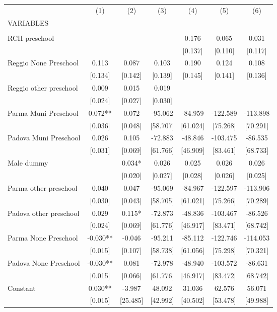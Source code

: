 \begin{tabular}{lcccccc} \hline
 & (1) & (2) & (3) & (4) & (5) & (6) \\
VARIABLES &  &  &  &  &  &  \\ \hline
 &  &  &  &  &  &  \\
RCH preschool &  &  &  & 0.176 & 0.065 & 0.031 \\
 &  &  &  & [0.137] & [0.110] & [0.117] \\
Reggio None Preschool & 0.113 & 0.087 & 0.103 & 0.190 & 0.124 & 0.108 \\
 & [0.134] & [0.142] & [0.139] & [0.145] & [0.141] & [0.136] \\
Reggio other preschool & 0.009 & 0.015 & 0.019 &  &  &  \\
 & [0.024] & [0.027] & [0.030] &  &  &  \\
Parma Muni Preschool & 0.072** & 0.072 & -95.062 & -84.959 & -122.589 & -113.898 \\
 & [0.036] & [0.048] & [58.707] & [61.024] & [75.268] & [70.291] \\
Padova Muni Preschool & 0.026 & 0.105 & -72.883 & -48.846 & -103.475 & -86.535 \\
 & [0.031] & [0.069] & [61.766] & [46.909] & [83.461] & [68.733] \\
Male dummy &  & 0.034* & 0.026 & 0.025 & 0.026 & 0.026 \\
 &  & [0.020] & [0.027] & [0.028] & [0.026] & [0.025] \\
Parma other preschool & 0.040 & 0.047 & -95.069 & -84.967 & -122.597 & -113.906 \\
 & [0.030] & [0.043] & [58.705] & [61.021] & [75.266] & [70.289] \\
Padova other preschool & 0.029 & 0.115* & -72.873 & -48.836 & -103.467 & -86.526 \\
 & [0.024] & [0.069] & [61.776] & [46.917] & [83.471] & [68.742] \\
Parma None Preschool & -0.030** & -0.046 & -95.211 & -85.112 & -122.746 & -114.053 \\
 & [0.015] & [0.107] & [58.738] & [61.056] & [75.298] & [70.321] \\
Padova None Preschool & -0.030** & 0.081 & -72.978 & -48.940 & -103.572 & -86.631 \\
 & [0.015] & [0.066] & [61.776] & [46.917] & [83.472] & [68.742] \\
Constant & 0.030** & -3.987 & 48.092 & 31.036 & 62.576 & 56.071 \\
 & [0.015] & [25.485] & [42.992] & [40.502] & [53.478] & [49.988] \\

\end{tabular}
